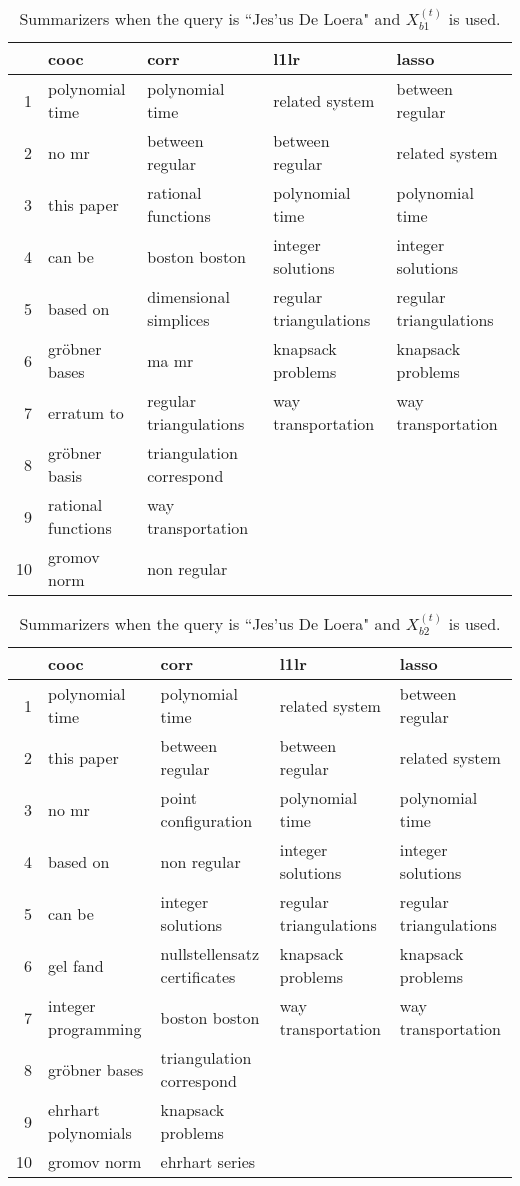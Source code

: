 \documentclass{article}
\begin{document}
\begin{table}[H]
\begin{center}
\begin{tabular}{|r|llll|}
 \hline
& cooc & corr & l1lr & lasso \\
 \hline
1 & polynomial time & polynomial time & related system & between regular \\
 2 & no mr & between regular & between regular & related system \\
 3 & this paper & rational functions & polynomial time & polynomial time \\
 4 & can be & boston boston & integer solutions & integer solutions \\
 5 & based on & dimensional simplices & regular triangulations & regular triangulations \\
 6 & gröbner bases & ma mr & knapsack problems & knapsack problems \\
 7 & erratum to & regular triangulations & way transportation & way transportation \\
 8 & gröbner basis & triangulation correspond & & \\
 9 & rational functions & way transportation & & \\
 10 & gromov norm & non regular & & \\
 \hline
\end{tabular}
\end{center}
\caption{Summarizers when the query is ``Jes\a'us De Loera" and $X_{b1}^{(t)}$ is used.}
\end{table}

\begin{table}[H]
\begin{center}
\begin{tabular}{|r|llll|}
 \hline
& cooc & corr & l1lr & lasso \\
 \hline
1 & polynomial time & polynomial time & related system & between regular \\
 2 & this paper & between regular & between regular & related system \\
 3 & no mr & point configuration & polynomial time & polynomial time \\
 4 & based on & non regular & integer solutions & integer solutions \\
 5 & can be & integer solutions & regular triangulations & regular triangulations \\
 6 & gel fand & nullstellensatz certificates & knapsack problems & knapsack problems \\
 7 & integer programming & boston boston & way transportation & way transportation \\
 8 & gröbner bases & triangulation correspond & & \\
 9 & ehrhart polynomials & knapsack problems & & \\
 10 & gromov norm & ehrhart series & & \\
 \hline
\end{tabular}
\end{center}
\caption{Summarizers when the query is ``Jes\a'us De Loera" and $X_{b2}^{(t)}$ is used.}
\end{table}
\end{document}
